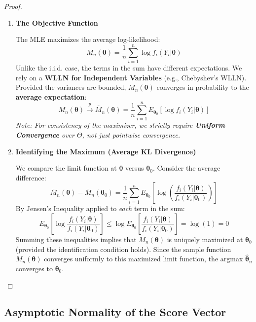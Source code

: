 \documentclass[
  letterpaper,
  DIV=11,
  numbers=noendperiod]{scrreprt}
\renewcommand{\[}{\begin{equation}}
\renewcommand{\]}{\end{equation}}
\theoremstyle{definition}
\theoremstyle{plain}
\theoremstyle{plain}
\theoremstyle{plain}
\theoremstyle{definition}
\theoremstyle{plain}
\theoremstyle{remark}
\begin{document}
\begin{proof}
\leavevmode

\begin{enumerate}
\def\labelenumi{\arabic{enumi}.}
\item
  \textbf{The Objective Function}

  The MLE maximizes the average log-likelihood: \[
  M_n(\boldsymbol{\theta}) = \frac{1}{n} \sum_{i=1}^n \log f_i(Y_i|\boldsymbol{\theta})
  \] Unlike the i.i.d. case, the terms in the sum have different
  expectations. We rely on a \textbf{WLLN for Independent Variables}
  (e.g., Chebyshev's WLLN). Provided the variances are bounded,
  \(M_n(\boldsymbol{\theta})\) converges in probability to the
  \textbf{average expectation}: \[
  M_n(\boldsymbol{\theta}) \xrightarrow{p} \overline{M}_n(\boldsymbol{\theta}) = \frac{1}{n} \sum_{i=1}^n E_{\boldsymbol{\theta}_0} [\log f_i(Y_i|\boldsymbol{\theta})]
  \] \emph{Note: For consistency of the maximizer, we strictly require
  \textbf{Uniform Convergence} over \(\Theta\), not just pointwise
  convergence.}
\item
  \textbf{Identifying the Maximum (Average KL Divergence)}

  We compare the limit function at \(\boldsymbol{\theta}\) versus
  \(\boldsymbol{\theta}_0\). Consider the average difference: \[
  \overline{M}_n(\boldsymbol{\theta}) - \overline{M}_n(\boldsymbol{\theta}_0) = \frac{1}{n} \sum_{i=1}^n E_{\boldsymbol{\theta}_0} \left[ \log \left( \frac{f_i(Y_i|\boldsymbol{\theta})}{f_i(Y_i|\boldsymbol{\theta}_0)} \right) \right]
  \] By Jensen's Inequality applied to \emph{each} term in the sum: \[
  E_{\boldsymbol{\theta}_0} \left[ \log \frac{f_i(Y_i|\boldsymbol{\theta})}{f_i(Y_i|\boldsymbol{\theta}_0)} \right] \le \log E_{\boldsymbol{\theta}_0} \left[ \frac{f_i(Y_i|\boldsymbol{\theta})}{f_i(Y_i|\boldsymbol{\theta}_0)} \right] = \log(1) = 0
  \] Summing these inequalities implies that
  \(\overline{M}_n(\boldsymbol{\theta})\) is uniquely maximized at
  \(\boldsymbol{\theta}_0\) (provided the identification condition
  holds). Since the sample function \(M_n(\boldsymbol{\theta})\)
  converges uniformly to this maximized limit function, the argmax
  \(\hat{\boldsymbol{\theta}}_n\) converges to
  \(\boldsymbol{\theta}_0\).
\end{enumerate}

\end{proof}

\subsection{Asymptotic Normality of the Score
Vector}\label{asymptotic-normality-of-the-score-vector}
\end{document}

